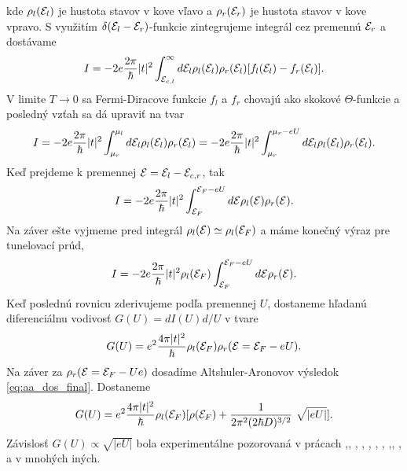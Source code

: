 kde $\rho_l(\mathcal{E}_l)$  je hustota stavov v kove vľavo a $\rho_r(\mathcal{E}_r)$ je hustota stavov v kove vpravo. S využitím $\delta(\mathcal{E}_l-\mathcal{E}_r)$-funkcie zintegrujeme integrál cez premennú $\mathcal{E}_r$ a dostávame
\begin{equation}
\label{eq:02current3}
I= -2e \frac{2\pi}{\hbar} |t|^{2} \int_{\mathcal{E}_{c,l}}^\infty d\mathcal{E}_l \rho_l(\mathcal{E}_l)\rho_r(\mathcal{E}_l) [f_l(\mathcal{E}_l) -  f_r(\mathcal{E}_l)] \text{.}
\end{equation}
V limite $T \rightarrow 0$ sa Fermi-Diracove funkcie $f_l$ a $f_r$ chovajú ako skokové $\Theta$-funkcie a posledný vzťah sa dá upraviť na tvar
\begin{equation}
\label{eq:02current3}
I= -2e \frac{2\pi}{\hbar} |t|^{2} \int_{\mu_{r}}^{\mu_{l}} d\mathcal{E}_l \rho_l(\mathcal{E}_l)\rho_r(\mathcal{E}_l) =  -2e \frac{2\pi}{\hbar} |t|^{2}  \int_{\mu_{r}}^{\mu_{r}-eU} d\mathcal{E}_l  \rho_l(\mathcal{E}_l) \rho_r(\mathcal{E}_l) \text{.}
\end{equation}
Keď prejdeme k premennej $ \mathcal{E} = \mathcal{E}_l - \mathcal{E}_{c,r}$, tak
\begin{equation}
\label{eq:02current3}
I=  -2e \frac{2\pi}{\hbar} |t|^{2}  \int_{\mathcal{E}_{F}}^{\mathcal{E}_{F}-eU} d\mathcal{E}  \rho_l(\mathcal{E}) \rho_r(\mathcal{E}) \text{.}
\end{equation}
Na záver ešte vyjmeme pred integrál $\rho_l(\mathcal{E}) \simeq \rho_l(\mathcal{E}_F)$ a máme konečný výraz pre tunelovací prúd,
\begin{equation}
\label{eq:02current4}
I =  -2e \frac{2\pi}{\hbar} |t|^{2} \rho_l(\mathcal{E}_F) \int_{\mathcal{E}_{F}}^{\mathcal{E}_{F}-eU} d\mathcal{E}   \rho_r(\mathcal{E}) \text{.}
\end{equation}
Keď poslednú rovnicu zderivujeme podľa premennej $U$, dostaneme hľadanú diferenciálnu vodivosť $G(U) = dI(U)d/U$ v tvare
\begin{align}
\label{eq:02diff}
G(U)=e^2\frac{4\pi|t|^2}{\hbar}\rho_l(\mathcal{E}_F)\rho_r(\mathcal{E}=\mathcal{E}_F-eU) \text{.}
\end{align}
Na záver za $\rho_r(\mathcal{E}=\mathcal{E}_F-Ue)$ dosadíme Altshuler-Aronovov výsledok  \eqref{eq:aa_dos_final}. Dostaneme
\begin{align}
\label{eq:02diff_2}
G(U)=e^2\frac{4\pi|t|^2}{\hbar}\rho_l(\mathcal{E}_F)[\rho(\mathcal{E}_F)+  \frac{1}{2\pi^2 (2\hbar D)^{3/2}}  \ \sqrt{|eU|}] \text{.}
\end{align}
Závislosť $G(U) \propto  \sqrt{|eU|} $ bola experimentálne pozorovaná v prácach \cite{Abeles},\cite{Dynes},\cite{McMillan2}
\cite{ImryOvadyahu}, \cite{Schmitz1}, \cite{Schmitz2}, \cite{Escudero}, \cite{Teizer}, \cite{Mazur},\cite{Luna2014}, \cite{Luna2015},
a v mnohých iných.

